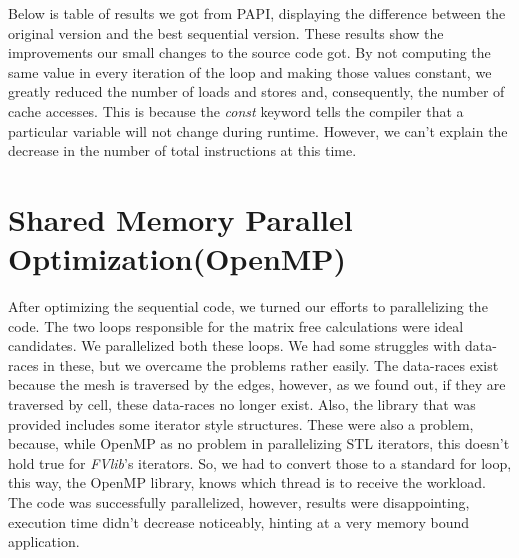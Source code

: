 \documentclass[a4paper,10pt,openright,openbib,twocolumn]{article}
\begin{document}
Below is table of results we got from PAPI, displaying the difference between the original version and the best sequential version. 
These results show the improvements our small changes to the source code got. By not computing the same value in every iteration of the loop and making those values constant, we greatly reduced the number of loads and stores and, consequently, the number of cache accesses. This is because the \emph{const} keyword tells the compiler that a particular variable will not change during runtime. However, we can't explain the decrease in the number of total instructions at this time. 

\begin{table}[!htp]
    \caption{PAPI comparison}
    \label{tab:testcases}
\end{table}



\section{Shared Memory Parallel Optimization(OpenMP)}
\label{sec:openmp}
After optimizing the sequential code, we turned our efforts to parallelizing the code. The two loops responsible for the matrix free calculations were ideal candidates. We parallelized both these loops. We had some struggles with data-races in these, but we overcame the problems rather easily. The data-races exist because the mesh is traversed by the edges, however, as we found out, if they are traversed by cell, these data-races no longer exist. Also, the library that was provided includes some iterator style structures. These were also a problem, because, while OpenMP as no problem in parallelizing STL iterators, this doesn't hold true for \emph{FVlib}'s iterators. So, we had to convert those to a standard for loop, this way, the OpenMP library, knows which thread is to receive the workload. The code was successfully parallelized, however, results were disappointing, execution time didn't decrease noticeably, hinting at a very memory bound application. 
\end{document}

